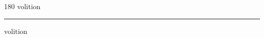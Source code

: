 
\begin{frame}
\begin{center}
\begin{turn}{180}
{\fontsize{2.5cm}{1em}\selectfont volition}
\end{turn}
\vspace{1em}\par  
\hrule
\vspace{1em}\par  
{\fontsize{2.5cm}{1em}\selectfont volition}
\end{center}
\end{frame}
